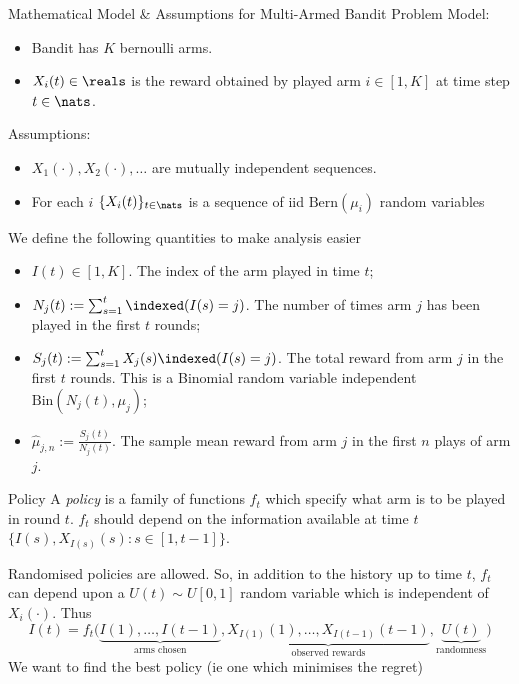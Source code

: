 \documentclass[11pt,a4paper]{article}
\begin{document}
  \begin{proposition}{Mathematical Model \& Assumptions for Multi-Armed Bandit Problem}
    Model:
    \begin{itemize}
      \item Bandit has $K$ bernoulli arms.
      \item $X_i(t)\in\reals$ is the reward obtained by played arm $i\in[1,K]$ at time step $t\in\nats$.
    \end{itemize}
    Assumptions:
    \begin{itemize}
      \item $X_1(\cdot),X_2(\cdot),\dots$ are mutually independent sequences.
      \item For each $i$ $\{X_i(t)\}_{t\in\nats}$ is a sequence of iid $\text{Bern}(\mu_i)$ random variables
    \end{itemize}
    We define the following quantities to make analysis easier
    \begin{itemize}
      \item $I(t)\in[1,K]$. The index of the arm played in time $t$;
      \item $N_j(t):=\sum_{s=1}^t\indexed(I(s)=j)$. The number of times arm $j$ has been played in the first $t$ rounds;
      \item $S_j(t):=\sum_{s=1}^tX_j(s)\indexed(I(s)=j)$. The total reward from arm $j$ in the first $t$ rounds. This is a Binomial random variable independent $\text{Bin}(N_j(t),\mu_j)$;
      \item $\hat\mu_{j,n}:=\frac{S_j(t)}{N_j(t)}$. The sample mean reward from arm $j$ in the first $n$ plays of arm $j$.
    \end{itemize}
  \end{proposition}

  \begin{definition}{Policy}
    A \textit{policy} is a family of functions $f_t$ which specify what arm is to be played in round $t$. $f_t$ should depend on the information available at time $t$ $\big\{I(s),X_{I(s)}(s):s\in[1,t-1]\big\}$.
    \par Randomised policies are allowed. So, in addition to the history up to time $t$, $f_t$ can depend upon a $U(t)\sim U[0,1]$ random variable which is independent of $X_i(\cdot)$. Thus
    \[ I(t)=f_t\big(\underbrace{I(1),\dots,I(t-1)}_\text{arms chosen},\underbrace{X_{I(1)}(1),\dots,X_{I(t-1)}(t-1)}_\text{observed rewards},\underbrace{U(t)}_\text{randomness}\big) \]
    We want to find the best policy (ie one which minimises the regret)
  \end{definition}
\end{document}
